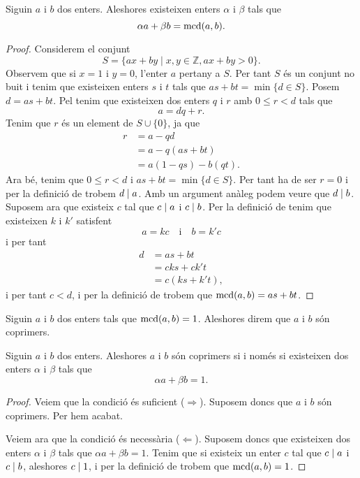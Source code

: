 \documentclass[../Apunts.tex]{subfiles}
\begin{document}
	\begin{theorem}
		\label{thm:identitat de Bézout}
		Siguin \(a\) i \(b\) dos enters. Aleshores existeixen enters \(\alpha\) i \(\beta\) tals que
		\[\alpha a+\beta b=\operatorname{mcd}(a,b).\]
		\begin{proof}
			Considerem el conjunt
			\[S=\{ax+by\mid x,y\in\mathbb{Z}, ax+by>0\}.\]
			Observem que si \(x=1\) i \(y=0\), l'enter \(a\) pertany a \(S\). Per tant \(S\) és un conjunt no buit i tenim que existeixen enters \(s\) i \(t\) tals que \(as+bt=\min\{d\in S\}\). Posem \(d=as+bt\). Pel  tenim que existeixen dos enters \(q\) i \(r\) amb \(0\leq r<d\) tals que
			\[a=dq+r.\]
			Tenim que \(r\) és un element de \(S\cup\{0\}\), ja que
			\begin{align*}
			r&=a-qd\\
			&=a-q(as+bt)\\
			&=a(1-qs)-b(qt).
			\end{align*}
			Ara bé, tenim que \(0\leq r<d\) i \(as+bt=\min\{d\in S\}\). Per tant ha de ser \(r=0\) i per la definició de  trobem \(d\mathrel{|} a\). Amb un argument anàleg podem veure que \(d\mathrel{|} b\). Suposem ara que existeix \(c\) tal que \(c\mathrel{|} a\) i \(c\mathrel{|} b\). Per la definició de  tenim que existeixen \(k\) i \(k'\) satisfent
			\[a=kc\quad\text{i}\quad b=k'c\]
			i per tant
			\begin{align*}
			d&=as+bt\\
			&=cks+ck't\\
			&=c(ks+k't),
			\end{align*}
			i per tant \(c<d\), i per la definició de  trobem que \(\operatorname{mcd}(a,b)=as+bt\).
		\end{proof}
	\end{theorem}
	\begin{definition}[Coprimers]
		\label{def:coprimers}
		Siguin \(a\) i \(b\) dos enters tals que \(\operatorname{mcd}(a,b)=1\). Aleshores direm que \(a\) i \(b\) són coprimers.
	\end{definition}
	\begin{theorem}
		\label{thm:condició equivalent a coprimers per Bézout}
		Siguin \(a\) i \(b\) dos enters. Aleshores \(a\) i \(b\) són coprimers si i només si existeixen dos enters \(\alpha\) i \(\beta\) tals que
		\[\alpha a+\beta b=1.\]
		\begin{proof}
			Veiem que la condició és suficient (\(\Rightarrow\)). Suposem doncs que \(a\) i \(b\) són coprimers. Per  hem acabat.
			
			Veiem ara que la condició és necessària (\(\Leftarrow\)). Suposem doncs que existeixen dos enters \(\alpha\) i \(\beta\) tals que \(\alpha a+\beta b=1\). Tenim que si existeix un enter \(c\) tal que \(c\mathrel{|} a\) i \(c\mathrel{|} b\), aleshores \(c\mathrel{|} 1\), i per la definició de  trobem que \(\operatorname{mcd}(a,b)=1\).
		\end{proof}
	\end{theorem}
\end{document}
